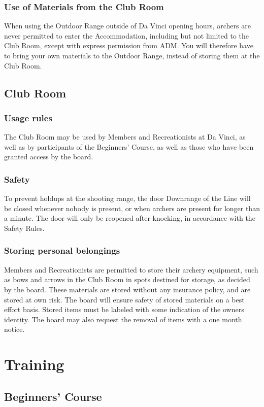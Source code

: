 \documentclass[a4paper]{article}
\newcommand{\Asr}{Safety Rules} %
\begin{document}
\subsubsection{Use of Materials from the Club Room}
When using the Outdoor Range outside of Da Vinci opening hours, archers are never permitted to enter the Accommodation, including but not limited to the Club Room, except with express permission from ADM. You will therefore have to bring your own materials to the Outdoor Range, instead of storing them at the Club Room.

\subsection{Club Room}
\subsubsection{Usage rules}
The Club Room may be used by Members and Recreationists at Da Vinci, as well as by participants of the Beginners' Course, as well as those who have been granted access by the board. 

\subsubsection{Safety}
To prevent holdups at the shooting range, the door Downrange of the Line will be closed whenever nobody is present, or when archers are present for longer than a minute. The door will only be reopened after knocking, in accordance with the \Asr .

\subsubsection{Storing personal belongings}
Members and Recreationists are permitted to store their archery equipment, such as bows and arrows in the Club Room in spots destined for storage, as decided by the board. These materials are stored without any insurance policy, and are stored at own risk. The board will ensure safety of stored materials on a best effort basis. Stored items must be labeled with some indication of the owners identity. The board may also request the removal of items with a one month notice.


\section{Training}
\subsection{Beginners' Course}
\end{document}
